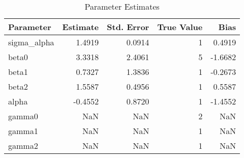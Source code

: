 \begin{table}
\caption{Parameter Estimates}
\begin{tabular}{lrrrr}
\toprule
Parameter & Estimate & Std. Error & True Value & Bias \\
\midrule
sigma_alpha & 1.4919 & 0.0914 & 1 & 0.4919 \\
beta0 & 3.3318 & 2.4061 & 5 & -1.6682 \\
beta1 & 0.7327 & 1.3836 & 1 & -0.2673 \\
beta2 & 1.5587 & 0.4956 & 1 & 0.5587 \\
alpha & -0.4552 & 0.8720 & 1 & -1.4552 \\
gamma0 & NaN & NaN & 2 & NaN \\
gamma1 & NaN & NaN & 1 & NaN \\
gamma2 & NaN & NaN & 1 & NaN \\
\bottomrule
\end{tabular}
\end{table}
